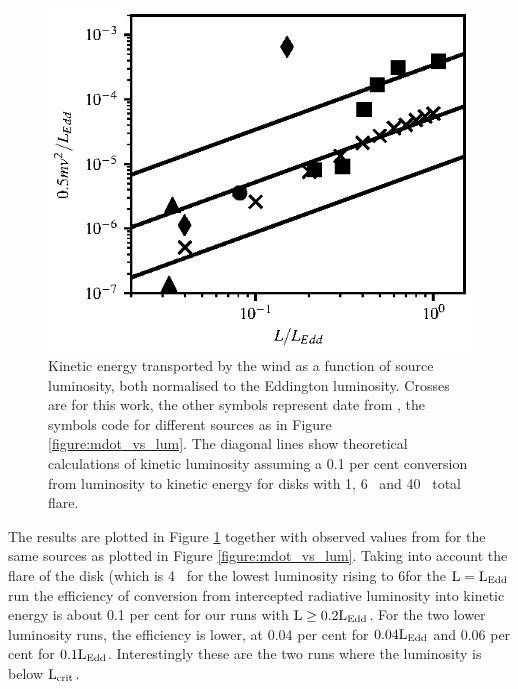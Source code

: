 \documentclass[a4paper,fleqn,usenatbib]{mnras}
\begin{document}
\begin{figure}
\includegraphics[width=\columnwidth]{figures/lum_vs_ke_ponti.eps}
\caption{Kinetic energy transported by the wind  as a function of source luminosity, both
normalised to the Eddington luminosity. Crosses are for this work, the other symbols represent
date from
\protect\cite{2016AN....337..512P}, the symbols code for different sources as in Figure \ref{figure:mdot_vs_lum}.
The diagonal lines show theoretical calculations of kinetic luminosity assuming a 0.1 per cent conversion
from luminosity to kinetic energy for disks with 1\degree, 6\degree~ and 40\degree~ total flare.}
\label{figure:ke_vs_lum}
\end{figure}

The results are plotted in Figure \ref{figure:ke_vs_lum} together with observed values from
\cite{2016AN....337..512P} for the same sources as plotted in Figure \ref{figure:mdot_vs_lum}. 
Taking into account the flare of the disk (which is 4\degree~ for the lowest luminosity rising to 6\degree for
the $\rm{L=L_{Edd}}$ run the efficiency of conversion from intercepted radiative luminosity into kinetic 
energy is about 0.1 per cent for our runs with $\rm{L \geq 0.2L_{Edd}}$. For the two lower luminosity runs,
the efficiency is lower, at 0.04 per cent for $\rm{0.04L_{Edd}}$ and 0.06 per cent for $\rm{0.1L_{Edd}}$.
Interestingly these are the two runs where the luminosity is below $\rm{L_{crit}}$.
\end{document}
